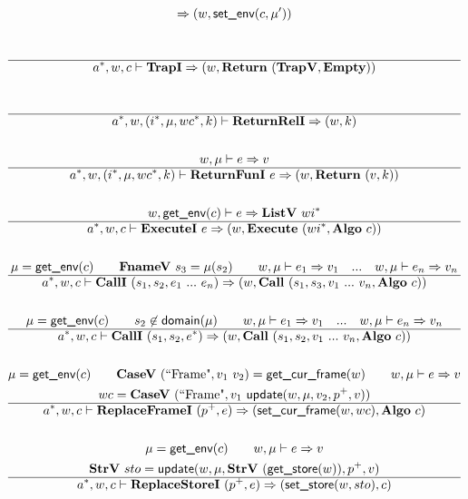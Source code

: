 \begin{gather*}
  \Rightarrow
  (w, \setenv(c, \mu')) \\
%
\newline \\
  \\
  \hline
  \seq{a}, w, c \vdash \trapi \Rightarrow (w, \ret ~ (\trapv, \mt)) \\
%
\newline \\
  \\
  \hline
  \seq{a}, w, (\seq{i}, \mu, wc^*, k) \vdash \returnreli \Rightarrow (w, k) \\
%
\newline \\
  w, \mu \vdash e \Rightarrow v \\
  \hline
  \seq{a}, w, (\seq{i}, \mu, wc^*, k) \vdash \returnfuni ~ e \Rightarrow
  (w, \ret ~ (v, k)) \\
%
\newline \\
  w, \getenv(c) \vdash e \Rightarrow \listv ~ wi^* \\
  \hline
  \seq{a}, w, c \vdash \executei ~ e \Rightarrow
  (w, \exe ~ (wi^*, \algo ~ c)) \\
%
\newline \\
  \mu = \getenv(c) \qquad
  \fnamev ~ s_3 = \mu(s_2) \qquad
  w, \mu \vdash e_1 \Rightarrow v_1 \quad ... \quad
  w, \mu \vdash e_n \Rightarrow v_n \\
  \hline
  \seq{a}, w, c \vdash \calli ~ (s_1, s_2, e_1 ~ ... ~ e_n) \Rightarrow
  (w, \call ~ (s_1, s_3, v_1 ~ ... ~ v_n, \algo ~ c)) \\
%
\newline \\
  \mu = \getenv(c) \qquad
  s_2 \not\in \domain(\mu) \qquad
  w, \mu \vdash e_1 \Rightarrow v_1 \quad ... \quad
  w, \mu \vdash e_n \Rightarrow v_n \\
  \hline
  \seq{a}, w, c \vdash \calli ~ (s_1, s_2, \seq e) \Rightarrow
  (w, \call ~ (s_1, s_2, v_1 ~ ... ~ v_n, \algo ~ c)) \\
%
\newline \\
  \mu = \getenv(c) \qquad
  \casev ~ (\text{``Frame"}, v_1 ~ v_2) = \getcurframe(w) \qquad
  w, \mu \vdash e \Rightarrow v \\
  wc = \casev ~ (\text{``Frame"}, v_1 ~ \update(w, \mu, v_2, p^+, v)) \\
  \hline
  \seq{a}, w, c \vdash \replaceframei ~ (p^+, e) \Rightarrow
  (\setcurframe(w, wc), \algo ~ c) \\
%
\newline \\
  \mu = \getenv(c) \qquad
  w, \mu \vdash e \Rightarrow v \\
  \strv ~ sto = \update(w, \mu, \strv ~ (\getstore(w)), p^+, v) \\
  \hline
  \seq{a}, w, c \vdash \replacestorei ~ (p^+, e)
  \Rightarrow (\setstore(w, sto), c) \\
\end{gather*}

